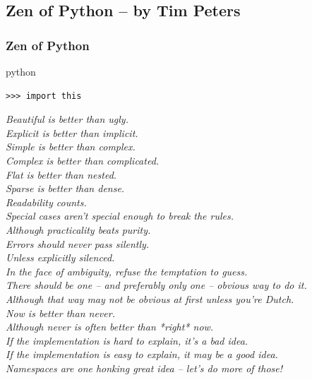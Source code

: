\documentclass{beamer}
\begin{document}
\subsection{Zen of Python -- by Tim Peters} 
\begin{frame}
    \frametitle{Zen of Python}

    \begin{exampleblock}{python}
    \begin{lstlisting}
>>> import this
    \end{lstlisting}
    \end{exampleblock}

    \scriptsize
    \emph{
    Beautiful is better than ugly.\\
    Explicit is better than implicit.\\
    Simple is better than complex.\\
    Complex is better than complicated.\\
    Flat is better than nested.\\
    Sparse is better than dense.\\
    Readability counts.\\
    Special cases aren't special enough to break the rules.\\
    Although practicality beats purity.\\
    Errors should never pass silently.\\
	Unless explicitly silenced.\\
	In the face of ambiguity, refuse the temptation to guess.\\
	There should be one -- and preferably only one -- obvious way to do it.\\
	Although that way may not be obvious at first unless you're Dutch.\\
	Now is better than never.\\
	Although never is often better than *right* now.\\
	If the implementation is hard to explain, it's a bad idea.\\
	If the implementation is easy to explain, it may be a good idea.\\
	Namespaces are one honking great idea -- let's do more of those!
    }

\end{frame}
\end{document}
